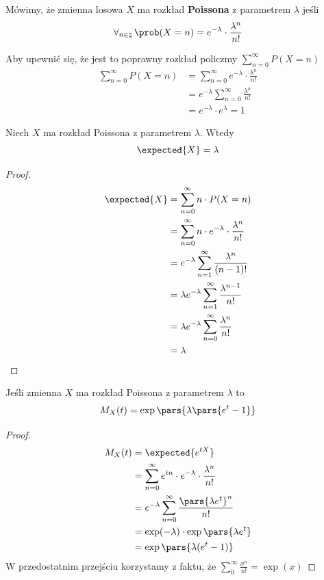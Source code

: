 \begin{definition}
	Mówimy, że zmienna losowa \( X \) ma rozkład
	\textbf{Poissona} z parametrem \( \lambda \) jeśli
	\[
		\forall_{n \in \natural} \, \prob(X = n) = e^{-\lambda} \cdot \frac{\lambda^n}{n!}
	\]
\end{definition}

Aby upewnić się, że jest to poprawny rozkład policzmy \( \sum_{n = 0}^\infty P(X = n) \)
\begin{align*}
	\sum_{n = 0}^\infty P(X = n)
	 & = \sum_{n = 0}^\infty e^{-\lambda} \cdot \frac{\lambda^n}{n!} \\
	 & = e^{-\lambda} \sum_{n=0}^\infty \frac{\lambda^n}{n!}         \\
	 & = e^{-\lambda} \cdot  e^\lambda = 1
\end{align*}

\begin{theorem}
	Niech \( X \) ma rozkład Poissona z parametrem \( \lambda \). Wtedy
	\[
		\expected{X} = \lambda
	\]
\end{theorem}
\begin{proof}
	\begin{align*}
		\expected{X} & = \sum_{n = 0}^\infty n \cdot P(X = n)                                \\
		             & = \sum_{n = 0}^\infty n \cdot e^{-\lambda} \cdot \frac{\lambda^n}{n!} \\
		             & = e^{-\lambda} \sum_{n=1}^\infty \frac{\lambda^n}{(n-1)!}             \\
		             & = \lambda e^{-\lambda} \sum_{n=1}^\infty \frac{\lambda^{n-1}}{n!}     \\
		             & = \lambda e^{-\lambda} \sum_{n=0}^\infty \frac{\lambda^n}{n!}         \\
		             & = \lambda
	\end{align*}
\end{proof}

\begin{theorem}[Lemat 5.3 P\&C]
	Jeśli zmienna \( X \) ma rozkład Poissona z parametrem \( \lambda \) to
	\[
		M_X(t) = \exp\pars{\lambda\pars{e^t -  1}}
	\]
\end{theorem}
\begin{proof}
	\begin{align*}
		M_X(t)
		 & = \expected{e^{tX}}                                                      \\
		 & = \sum_{n=0}^\infty e^{tn} \cdot e^{-\lambda} \cdot \frac{\lambda^n}{n!} \\
		 & = e^{-\lambda} \sum_{n=0}^\infty \frac{\pars{\lambda e^t}^n}{n!}         \\
		 & = \exp(-\lambda) \cdot \exp\pars{\lambda e^t}                            \\
		 & = \exp\pars{\lambda(e^t - 1)}
	\end{align*}
	W przedostatnim przejściu korzystamy z faktu, że \( \sum_{0}^\infty \frac{x^n}{n!} = \exp(x) \)
\end{proof}

